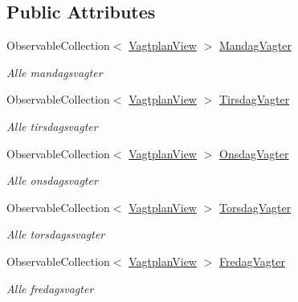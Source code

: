 \subsection*{Public Attributes}
\begin{DoxyCompactItemize}
\item 
Observable\+Collection$<$ \hyperlink{class__1aarsproeve_1_1_model_1_1_vagtplan_view}{Vagtplan\+View} $>$ \hyperlink{class__1aarsproeve_1_1_view_model_1_1_vagtplan_view_model_aab4a9280616fcd59a1d012cb12bd8195}{Mandag\+Vagter}
\begin{DoxyCompactList}\small\item\em Alle mandagsvagter \end{DoxyCompactList}\item 
Observable\+Collection$<$ \hyperlink{class__1aarsproeve_1_1_model_1_1_vagtplan_view}{Vagtplan\+View} $>$ \hyperlink{class__1aarsproeve_1_1_view_model_1_1_vagtplan_view_model_a7d6c62127834e177525b22eb6ddd2ab6}{Tirsdag\+Vagter}
\begin{DoxyCompactList}\small\item\em Alle tirsdagsvagter \end{DoxyCompactList}\item 
Observable\+Collection$<$ \hyperlink{class__1aarsproeve_1_1_model_1_1_vagtplan_view}{Vagtplan\+View} $>$ \hyperlink{class__1aarsproeve_1_1_view_model_1_1_vagtplan_view_model_a4ea415eb2f1e6f7e82e4018e276d1197}{Onsdag\+Vagter}
\begin{DoxyCompactList}\small\item\em Alle onsdagsvagter \end{DoxyCompactList}\item 
Observable\+Collection$<$ \hyperlink{class__1aarsproeve_1_1_model_1_1_vagtplan_view}{Vagtplan\+View} $>$ \hyperlink{class__1aarsproeve_1_1_view_model_1_1_vagtplan_view_model_a85143514a9445a534a3518738e53df82}{Torsdag\+Vagter}
\begin{DoxyCompactList}\small\item\em Alle torsdagssvagter \end{DoxyCompactList}\item 
Observable\+Collection$<$ \hyperlink{class__1aarsproeve_1_1_model_1_1_vagtplan_view}{Vagtplan\+View} $>$ \hyperlink{class__1aarsproeve_1_1_view_model_1_1_vagtplan_view_model_a3955ea1d063e57b61586ae4d2a46ea26}{Fredag\+Vagter}
\begin{DoxyCompactList}\small\item\em Alle fredagsvagter \end{DoxyCompactList}\item 

\end{DoxyCompactItemize}
